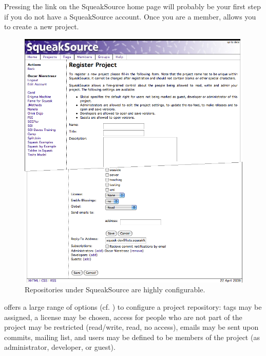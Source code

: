 \documentclass[a4paper,10pt,twoside]{book}
\begin{document}
Pressing the  link on the SqueakSource home page will probably be your first step if you do not have a SqueakSource account. 
Once you are a member,  allows you to create a new project. 


\begin{figure}[ht]\centering
	\includegraphics[width=.80\textwidth]{squeaksourcesetting}
	\caption{Repositories under SqueakSource are highly configurable.}
\end{figure}

\MC offers a large range of options (cf. ) to configure a project repository: tags may be assigned, a license may be chosen, access for people who are not part of the project may be restricted (read/write, read, no access), emails may be sent upon commits, mailing list, and users may be defined to be members of the project (as administrator, developer, or guest).

\end{document}
